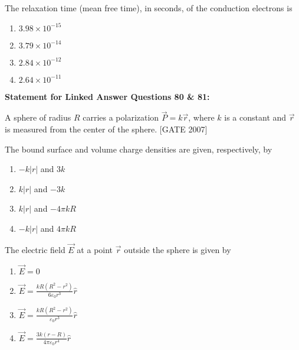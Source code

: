     \item The relaxation time (mean free time), in seconds, of the conduction electrons is
    \begin{multicols}{2}
    \begin{enumerate}
        \item $3.98 \times 10^{-15}$
        \item $3.79 \times 10^{-14}$
        \item $2.84 \times 10^{-12}$
        \item $2.64 \times 10^{-11}$
    \end{enumerate}
    \end{multicols}


\bigskip

\textbf{Statement for Linked Answer Questions 80 \& 81:}

A sphere of radius $R$ carries a polarization $\vec{P} = k\vec{r}$, where $k$ is a constant and $\vec{r}$ is measured from the center of the sphere.   \hfill{[GATE 2007]}


    \item  The bound surface and volume charge densities are given, respectively, by
    \begin{multicols}{2}
    \begin{enumerate}
        \item $-k|r|$ and $3k$
        \item $k|r|$ and $-3k$
        \item $k|r|$ and $-4\pi k R$
        \item $-k|r|$ and $4\pi k R$
    \end{enumerate}
    \end{multicols}

    \item  The electric field $\vec{E}$ at a point $\vec{r}$ outside the sphere is given by
    \begin{multicols}{2}
    \begin{enumerate}
        \item $\vec{E} = 0$\\
        \item $\vec{E} = \frac{kR(R^2 - r^2)}{6 \varepsilon_0 r^3} \hat{r}$
        \item $\vec{E} = \frac{kR(R^2 - r^2)}{\varepsilon_0 r^3} \hat{r}$\\
        \item $\vec{E} = \frac{3k(r - R)}{4\pi \varepsilon_0 r^4} \hat{r}$
    \end{enumerate}
    \end{multicols}



